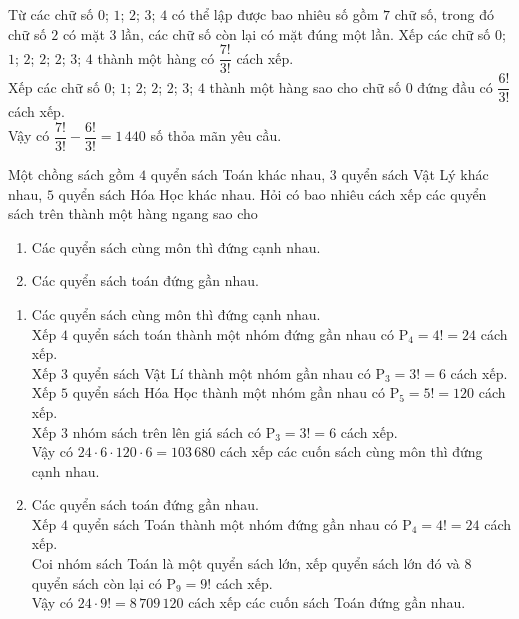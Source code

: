 \begin{vd}
	Từ các chữ số $0$; $1$; $2$; $3$; $4$ có thể lập được bao nhiêu số gồm $7$ chữ số, trong đó chữ số $2$ có mặt $3$ lần, các chữ số còn lại có mặt đúng một lần.
	\loigiai
	{
		Xếp các chữ số $0$; $1$; $2$; $2$; $2$; $3$; $4$ thành một hàng có $\dfrac{7!}{3!}$ cách xếp.\\
		Xếp các chữ số $0$; $1$; $2$; $2$; $2$; $3$; $4$ thành một hàng sao cho chữ số $0$ đứng đầu có $\dfrac{6!}{3!}$ cách xếp.\\
		Vậy có $\dfrac{7!}{3!}-\dfrac{6!}{3!}=1\, 440$ số thỏa mãn yêu cầu.
	}
\end{vd}
\begin{vd}
	Một chồng sách gồm $4$ quyển sách Toán khác nhau, $3$ quyển sách Vật Lý khác nhau, $5$ quyển sách Hóa Học khác nhau. Hỏi có bao nhiêu cách xếp các quyển sách trên thành một hàng ngang sao cho
	\begin{enumerate}
		\item Các quyển sách cùng môn thì đứng cạnh nhau.
		\item Các quyển sách toán đứng gần nhau.
	\end{enumerate}
	\loigiai
	{
		\begin{enumerate}
			\item Các quyển sách cùng môn thì đứng cạnh nhau.\\
			Xếp $4$ quyển sách toán thành một nhóm đứng gần nhau có $\mathrm{P}_4=4!=24$ cách xếp. \\
			Xếp $3$ quyển sách Vật Lí thành một nhóm gần nhau có $\mathrm{P}_3=3!=6$ cách xếp.\\
			Xếp $5$ quyển sách Hóa Học thành một nhóm gần nhau có $\mathrm{P}_5=5!=120$ cách xếp.\\
			Xếp $3$ nhóm sách trên lên giá sách có $\mathrm{P}_3=3!=6$ cách xếp.\\
			Vậy có $24\cdot 6\cdot 120\cdot 6=103\, 680$ cách xếp các cuốn sách cùng môn thì đứng cạnh nhau.
			\item Các quyển sách toán đứng gần nhau.\\
			Xếp $4$ quyển sách Toán thành một nhóm đứng gần nhau có $\mathrm{P}_4=4!=24$ cách xếp.\\
			Coi nhóm sách Toán là một quyển sách lớn, xếp quyển sách lớn đó và 8 quyển sách còn lại có $\mathrm{P}_9=9!$ cách xếp.\\
			Vậy có $24\cdot 9!=8\, 709\, 120$ cách xếp các cuốn sách Toán đứng gần nhau.
		\end{enumerate}
	}
\end{vd}
